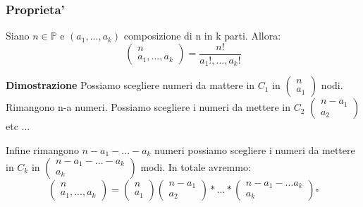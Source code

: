 \documentclass{article}
\begin{document}
        \subsubsection{Proprieta'}
        \begin{flushleft}
          Siano $n \in \mathbb{P}$ e $(a_1,...,a_k)$ composizione di n in k parti. Allora:
          \begin{equation}
            \begin{pmatrix}
              n \\ 
              a_1,...,a_k
            \end{pmatrix}=\frac{n!}{a_1!,...,a_k!}
          \end{equation}
        \end{flushleft}
        \begin{flushleft}
          \textbf{Dimostrazione} Possiamo scegliere numeri da mattere in $C_1$ in $\begin{pmatrix}
            n \\ 
            a_1
          \end{pmatrix}$ nodi. Rimangono n-a numeri. Possiamo scegliere i numeri da mettere in $C_2$ $\begin{pmatrix}
            n-a_1 \\ 
            a_2
          \end{pmatrix}$ etc ...
        \end{flushleft}
        \begin{flushleft}
          Infine rimangono $n-a_1-...-a_k$ numeri possiamo scegliere i numeri da mettere in $C_k$ in $\begin{pmatrix}
            n-a_1-...-a_k \\ 
            a_k
          \end{pmatrix}$ modi. In totale avremmo:
          \begin{equation}
            \begin{pmatrix}
              n \\ 
              a_1,...,a_k
            \end{pmatrix}= 
            \begin{pmatrix}
              n \\ 
              a_1
            \end{pmatrix}
            \begin{pmatrix}
              n-a_1 \\ 
              a_2
            \end{pmatrix}*...*
            \begin{pmatrix}
              n-a_1-...a_k \\ 
              a_k
            \end{pmatrix} \square
          \end{equation}
        \end{flushleft}
\end{document}
